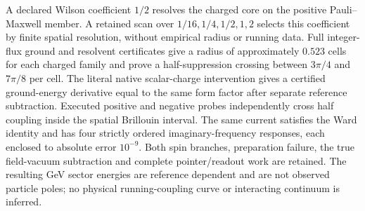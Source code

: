 A declared Wilson coefficient $1/2$ resolves the charged core on the
positive Pauli--Maxwell member. A retained scan over $1/16,1/4,1/2,1,2$
selects this coefficient by finite spatial resolution, without empirical
radius or running data. Full integer-flux ground and resolvent certificates
give a radius of approximately $0.523$ cells for each charged family and
prove a half-suppression crossing between $3\pi/4$ and $7\pi/8$ per cell.
The literal native scalar-charge intervention gives a certified ground-energy
derivative equal to the same form factor after separate reference subtraction.
Executed positive and negative probes independently cross half coupling
inside the spatial Brillouin interval. The same current satisfies the Ward identity and has four strictly ordered
imaginary-frequency responses, each enclosed to absolute error $10^{-9}$.
Both spin branches, preparation failure, the true field-vacuum subtraction
and complete pointer/readout work are retained. The resulting GeV sector
energies are reference dependent and are not observed particle poles; no
physical running-coupling curve or interacting continuum is inferred.
